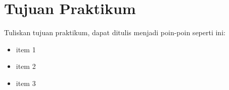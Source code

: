 \chapter{Tujuan Praktikum}

Tuliskan tujuan praktikum, dapat ditulis menjadi poin-poin seperti ini:
\begin{itemize}[noitemsep]
    \item item 1
    \item item 2
    \item item 3
\end{itemize}